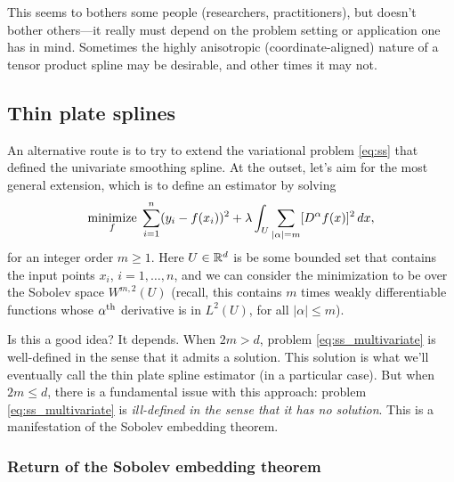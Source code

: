 \documentclass{article}
\begin{document}
This seems to bothers some people (researchers, practitioners), but doesn't
bother others---it really must depend on the problem setting or application one
has in mind. Sometimes the highly anisotropic (coordinate-aligned) nature of a
tensor product spline may be desirable, and other times it may not.    

\subsection{Thin plate splines}

An alternative route is to try to extend the variational problem \eqref{eq:ss}
that defined the univariate smoothing spline. At the outset, let's aim for the
most general extension, which is to define an estimator by solving
\begin{equation}
\label{eq:ss_multivariate}
\mathop{\mathrm{minimize}}_f \; \sum_{i=1}^n (y_i - f(x_i))^2 + \lambda \int_U \sum_{|\alpha| =
  m} [D^\alpha f(x)]^2 \, dx,
\end{equation}
for an integer order $m \geq 1$. Here $U \in \mathbb{R}^d$ is be some bounded set that
contains the input points $x_i$, $i=1,\dots,n$, and we can consider the
minimization to be over the Sobolev space $W^{m,2}(U)$ (recall, this contains
$m$ times weakly differentiable functions whose $\alpha^{\text{th}}$ derivative is in
$L^2(U)$, for all $|\alpha| \leq m$).     

Is this a good idea? It depends. When $2m > d$, problem
\eqref{eq:ss_multivariate} is well-defined in the sense that it admits a
solution. This solution is what we'll eventually call the thin plate spline
estimator (in a particular case). But when $2m \leq d$, there is a fundamental
issue with this approach: problem \eqref{eq:ss_multivariate} is
\emph{ill-defined in the sense that it has no solution}. This is a manifestation
of the Sobolev embedding theorem.

\subsubsection{Return of the Sobolev embedding theorem}
\end{document}

